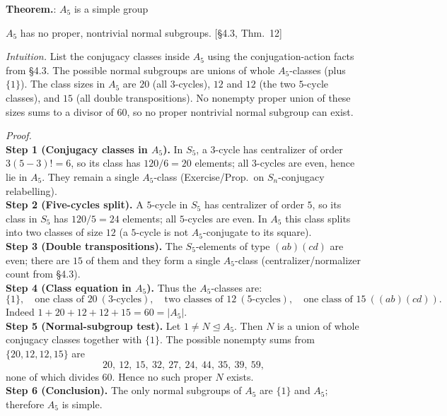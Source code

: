 \documentclass[12pt]{article}
\theoremstyle{definition}
\begin{document}
\newpage


\noindent\textbf{Theorem.}: $A_5$ is a simple group

\newpage

$A_5$ has no proper, nontrivial normal subgroups. \hfill {\footnotesize [§4.3, Thm.~12]}\\

\dotfill

\emph{Intuition.} List the conjugacy classes inside $A_5$ using the conjugation-action facts from §4.3. The possible normal subgroups are unions of whole $A_5$-classes (plus $\{1\}$). The class sizes in $A_5$ are $20$ (all $3$-cycles), $12$ and $12$ (the two $5$-cycle classes), and $15$ (all double transpositions). No nonempty proper union of these sizes sums to a divisor of $60$, so no proper nontrivial normal subgroup can exist.\\

\dotfill

\emph{Proof.}\\
\textbf{Step 1 (Conjugacy classes in $A_5$).} In $S_5$, a $3$-cycle has centralizer of order $3(5-3)!=6$, so its class has $120/6=20$ elements; all $3$-cycles are even, hence lie in $A_5$. They remain a single $A_5$-class (Exercise/Prop.~on $S_n$-conjugacy relabelling).\\
\textbf{Step 2 (Five-cycles split).} A $5$-cycle in $S_5$ has centralizer of order $5$, so its class in $S_5$ has $120/5=24$ elements; all $5$-cycles are even. In $A_5$ this class splits into two classes of size $12$ (a $5$-cycle is not $A_5$-conjugate to its square).\\
\textbf{Step 3 (Double transpositions).} The $S_5$-elements of type $(ab)(cd)$ are even; there are $15$ of them and they form a single $A_5$-class (centralizer/normalizer count from §4.3).\\
\textbf{Step 4 (Class equation in $A_5$).} Thus the $A_5$-classes are:
\[
\{1\},\quad \text{one class of }20\ (3\text{-cycles}),\quad \text{two classes of }12\ (5\text{-cycles}),\quad \text{one class of }15\ ((ab)(cd)).
\]
Indeed $1+20+12+12+15=60=|A_5|$.\\
\textbf{Step 5 (Normal-subgroup test).} Let $1\ne N\trianglelefteq A_5$. Then $N$ is a union of whole conjugacy classes together with $\{1\}$. The possible nonempty sums from $\{20,12,12,15\}$ are
\[
20,\ 12,\ 15,\ 32,\ 27,\ 24,\ 44,\ 35,\ 39,\ 59,
\]
none of which divides $60$. Hence no such proper $N$ exists.\\
\textbf{Step 6 (Conclusion).} The only normal subgroups of $A_5$ are $\{1\}$ and $A_5$; therefore $A_5$ is simple.\\
\end{document}
